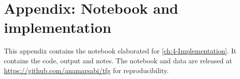 
\chapter{Appendix: Notebook and implementation}\label{ap:appendix_notebook}
This appendix contains the notebook elaborated for \autoref{ch:4-Implementation}. It contains the code, output and notes. The notebook and data are released at \url{https://github.com/anamarsabi/tfg} for reproducibility.


\endinput
